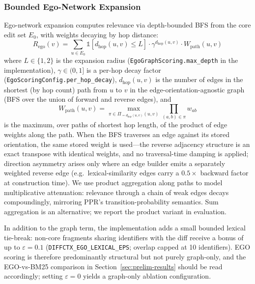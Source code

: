 \documentclass[11pt, a4paper]{article}
\providecommand{\mathbbm}[1]{\mathds{#1}}
\begin{document}
\subsubsection{Bounded Ego-Network Expansion}
\label{sec:ego}

Ego-network expansion computes relevance via depth-bounded BFS from the core edit set $E_0$, with weights decaying by hop distance:
\begin{equation}
R_{\mathrm{ego}}(v) = \sum_{u \in E_0} \mathbbm{1}[d_{\mathrm{hop}}(u,v) \leq L] \cdot \gamma^{d_{\mathrm{hop}}(u,v)} \cdot W_{\mathrm{path}}(u, v)
\end{equation}
where $L \in \{1, 2\}$ is the expansion radius (\texttt{EgoGraphScoring.max\_depth} in the implementation), $\gamma \in (0, 1]$ is a per-hop decay factor (\texttt{EgoScoringConfig.per\_hop\_decay}), $d_{\mathrm{hop}}(u,v)$ is the number of edges in the shortest (by hop count) path from $u$ to $v$ in the edge-orientation-agnostic graph (BFS over the union of forward and reverse edges), and
\begin{equation}
W_{\mathrm{path}}(u, v) = \max_{\pi \in \Pi_{= d_{\mathrm{hop}}(u,v)}(u,v)} \prod_{(a,b) \in \pi} w_{ab}
\end{equation}
is the maximum, over paths of shortest hop length, of the product of edge weights along the path. When the BFS traverses an edge against its stored orientation, the same stored weight is used---the reverse adjacency structure is an exact transpose with identical weights, and no traversal-time damping is applied; direction asymmetry arises only where an edge builder emits a separately weighted reverse edge (e.g.\ lexical-similarity edges carry a $0.5\times$ backward factor at construction time). We use product aggregation along paths to model multiplicative attenuation: relevance through a chain of weak edges decays compoundingly, mirroring PPR's transition-probability semantics. Sum aggregation is an alternative; we report the product variant in evaluation.

In addition to the graph term, the implementation adds a small bounded lexical tie-break: non-core fragments sharing identifiers with the diff receive a bonus of up to $\varepsilon = 0.1$ (\texttt{DIFFCTX\_EGO\_LEXICAL\_EPS}; overlap capped at 10 identifiers). EGO scoring is therefore predominantly structural but not purely graph-only, and the EGO-vs-BM25 comparison in Section~\ref{sec:prelim-results} should be read accordingly; setting $\varepsilon = 0$ yields a graph-only ablation configuration.
\end{document}
